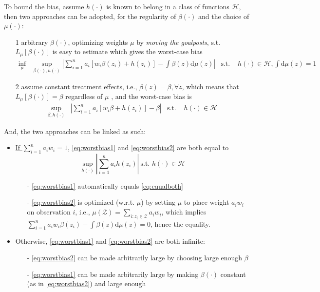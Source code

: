 \documentclass{article}
\begin{document}
To bound the bias, assume $h(\cdot)$ is known to belong in a class of functions $\mathcal{H}$, then two approaches can be adopted, for the regularity of $\beta(\cdot)$ and the choice of $\mu(\cdot)$:
\begin{itemize}
  \item[1] arbitrary $\beta(\cdot)$, optimizing weights $\mu$ by \textit{moving the goalposts}, s.t. $L_{\mu}\left[\beta(\cdot)\right]$ is easy to estimate \citep{crump2006moving,imbens2019optimized}
  which gives the worst-case bias
  \begin{align}\label{eq:worstbias1}
    \inf_{\mu} &\sup_{\beta(\cdot),h(\cdot)}\left\vert \sum^n_{i=1}a_i\left[w_i\beta(z_i)+h(z_i)\right] - \int\beta(z)\mathrm{d}\mu(z) \right\vert &\text{s.t. } & h(\cdot)\in\mathcal{H},\int \mathrm{d}\mu(z)=1
  \end{align}
  \item[2] assume constant treatment effects, i.e., $\beta(z)=\beta,\forall z$, which means that $L_{\mu}\left[\beta(\cdot)\right]=\beta$ regardless of $\mu$ \citep{armstrong2020bias}, and the worst-case bias is 
  \begin{align}\label{eq:worstbias2}
    \sup_{\beta,h(\cdot)}&\left\vert \sum^n_{i=1}a_i\left[w_i\beta + h(z_i)\right] -\beta \right\vert & \text{s.t. } & h(\cdot)\in\mathcal{H}
  \end{align}
\end{itemize}

And, the two approaches can be linked as such:
\begin{itemize}
  \item \underline{If $\sum^n_{i=1}a_iw_i=1$}, \ref{eq:worstbias1} and \ref{eq:worstbias2} are both equal to
  \begin{equation}\label{eq:equalboth}
    \sup_{h(\cdot)}\left\vert \sum^n_{i=1}a_ih(z_i) \right\vert\ \text{s.t. } h(\cdot)\in\mathcal{H}
  \end{equation}
  \begin{itemize}
    \item[-] \ref{eq:worstbias1} automatically equals \ref{eq:equalboth}
    \item[-] \ref{eq:worstbias2} is optimized (w.r.t. $\mu$) by setting $\mu$ to place weight $a_iw_i$ on observation $i$, i.e., $\mu(\mathcal{Z})=\sum_{i:z_i\in\mathcal{Z}}a_iw_i$, which implies $\sum^n_{i=1}a_iw_i\beta(z_i)-\int\beta(z)\mathrm{d}\mu(z)=0$, hence the equality.
  \end{itemize}

  \item Otherwise, \ref{eq:worstbias1} and \ref{eq:worstbias2} are both infinite:
  \begin{itemize}
    \item[-] \ref{eq:worstbias2} can be made arbitrarily large by choosing large enough $\beta$ 
    \item[-] \ref{eq:worstbias1} can be made arbitrarily large by making $\beta(\cdot)$ constant (as in \ref{eq:worstbias2}) and large enough
  \end{itemize}
\end{itemize}
\end{document}
